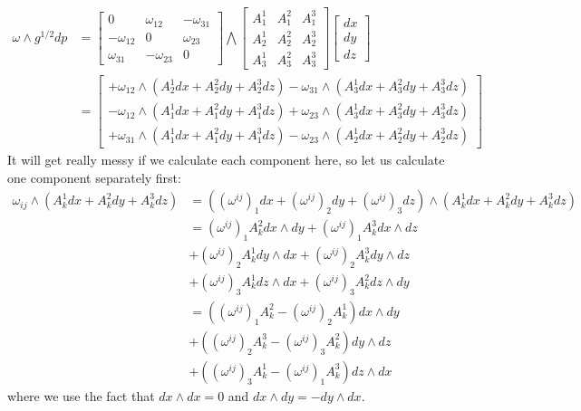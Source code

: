 \documentclass[../thesis.tex]{subfiles}
\begin{document}
\begin{align*}
  \omega \wedge g^{1/2}dp &= 
  \begin{bmatrix}
    0 & \omega_{12} & -\omega_{31} \\
    -\omega_{12} & 0 & \omega_{23} \\
    \omega_{31} & -\omega_{23} & 0
   \end{bmatrix}
   \bigwedge \begin{bmatrix}
    A^1_1 & A^2_1 & A^3_1 \\ A^1_2 & A^2_2 & A^3_2 \\ A^1_3 & A^2_3 & A^3_3 
  \end{bmatrix}
  \begin{bmatrix}
    dx \\ dy \\ dz
  \end{bmatrix} \\
  &= \begin{bmatrix}
    +\omega_{12} \wedge (A^1_2dx + A^2_2dy + A^3_2dz) - \omega_{31} \wedge (A^1_3dx + A^2_3dy + A^3_3dz) \\
    -\omega_{12} \wedge (A^1_1dx + A^2_1dy + A^3_1dz) + \omega_{23} \wedge (A^1_3dx + A^2_3dy + A^3_3dz) \\
    +\omega_{31} \wedge (A^1_1dx + A^2_1dy + A^3_1dz) - \omega_{23} \wedge (A^1_2dx+ A^2_2dy + A^3_2dz)
  \end{bmatrix}
\end{align*}
It will get really messy if we calculate each component here, so let us calculate one component separately first:
\begin{align*}
  \omega_{ij} \wedge (A^1_kdx + A^2_kdy + A^3_kdz) &=
  ((\omega^{ij})_1dx + (\omega^{ij})_2dy + (\omega^{ij})_3dz) \wedge (A^1_kdx + A^2_kdy+A^3_kdz) \\
  &= (\omega^{ij})_1 A^2_k dx\wedge dy + (\omega^{ij})_1 A^3_k dx \wedge dz \\
  &+ (\omega^{ij})_2 A^1_k dy\wedge dx + (\omega^{ij})_2 A^3_k dy \wedge dz \\
  &+ (\omega^{ij})_3 A^1_k dz\wedge dx + (\omega^{ij})_3 A^2_k dz \wedge dy \\
  &= ((\omega^{ij})_1A^2_k - (\omega^{ij})_2A^1_k)dx \wedge dy \\
  &+ ((\omega^{ij})_2A^3_k - (\omega^{ij})_3A^2_k)dy \wedge dz \\
  &+ ((\omega^{ij})_3A^1_k - (\omega^{ij})_1A^3_k)dz \wedge dx
\end{align*}
where we use the fact that $dx \wedge dx = 0$ and $dx \wedge dy = -dy \wedge dx$.
\end{document}
